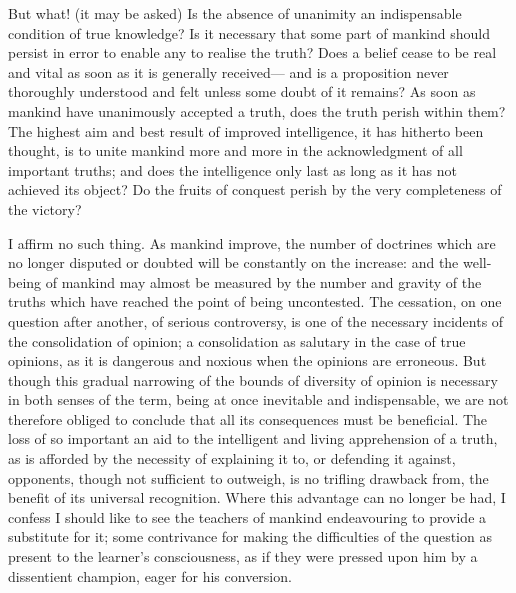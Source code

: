 \documentclass[11pt,openany]{book}
\begin{document}
But what! (it may be asked) Is the absence of unanimity an indispensable condition of true knowledge? Is it necessary that some part of mankind should persist in error to enable any to realise the truth? Does a belief cease to be real and vital as soon as it is generally received--- and is a proposition never thoroughly understood and felt unless some doubt of it remains? As soon as mankind have unanimously accepted a truth, does the truth perish within them? The highest aim and best result of improved intelligence, it has hitherto been thought, is to unite mankind more and more in the acknowledgment of all important truths; and does the intelligence only last as long as it has not achieved its object? Do the fruits of conquest perish by the very completeness of the victory?

I affirm no such thing. As mankind improve, the number of doctrines which are no longer disputed or doubted will be constantly on the increase: and the well-being of mankind may almost be measured by the number and gravity of the truths which have reached the point of being uncontested. The cessation, on one question after another, of serious controversy, is one of the necessary incidents of the consolidation of opinion; a consolidation as salutary in the case of true opinions, as it is dangerous and noxious when the opinions are erroneous. But though this gradual narrowing of the bounds of diversity of opinion is necessary in both senses of the term, being at once inevitable and indispensable, we are not therefore obliged to conclude that all its consequences must be beneficial. The loss of so important an aid to the intelligent and living apprehension of a truth, as is afforded by the necessity of explaining it to, or defending it against, opponents, though not sufficient to outweigh, is no trifling drawback from, the benefit of its universal recognition. Where this advantage can no longer be had, I confess I should like to see the teachers of mankind endeavouring to provide a substitute for it; some contrivance for making the difficulties of the question as present to the learner's consciousness, as if they were pressed upon him by a dissentient champion, eager for his conversion.
\end{document}
